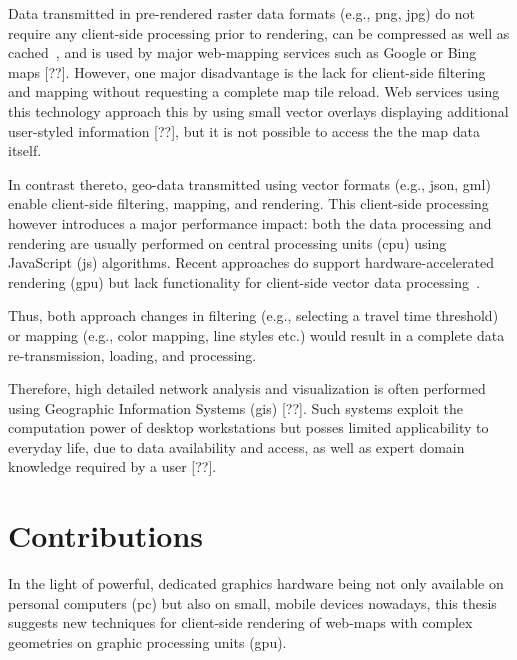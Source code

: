     Data transmitted in pre-rendered raster data formats (e.g., \acrshort{png},
    \acrshort{jpg}) do
    not require any client-side processing prior to rendering, can be compressed
    as well as cached~\cite{ESRI2006}, and is used by major web-mapping services
    such as Google or Bing maps [??]. However, one major disadvantage is the
    lack for client-side filtering and mapping without requesting a complete map
    tile reload. Web services using this technology approach this by using small
    vector overlays displaying additional user-styled information [??], but it
    is not possible to access the the map data itself.\par

    In contrast thereto, geo-data transmitted using vector formats
    (e.g., \acrshort{json}, \acrshort{gml}) enable
    client-side filtering, mapping, and rendering. This client-side processing
    however introduces a major performance impact: both the data processing and
    rendering are usually performed on central processing units (\acrshort{cpu})
    using JavaScript (\acrshort{js}) algorithms. Recent approaches do support
    hardware-accelerated rendering (\acrshort{gpu}) but lack functionality for
    client-side vector data processing~\cite{Gaffuri2012}.\par

    Thus, both approach changes in filtering (e.g., selecting a travel time
    threshold) or mapping (e.g., color mapping, line styles etc.) would result
    in a complete data re-transmission, loading, and processing.\par

    Therefore, high detailed network analysis and visualization is often
    performed using Geographic Information Systems (\acrshort{gis}) [??]. Such
    systems
    exploit the computation power of desktop workstations but posses limited
    applicability to everyday life, due to data availability and access, as well
    as expert domain knowledge required by a user [??].\par

  \section{Contributions}
    \label{sec:intro:contr}

    In the light of powerful, dedicated graphics hardware being not only
    available on personal computers (\acrshort{pc}) but also
    on small, mobile devices nowadays, this thesis suggests new techniques for
    client-side rendering of web-maps with complex geometries on graphic
    processing units (\acrshort{gpu}).\par

